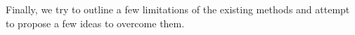 Finally, we try to outline a few limitations of the existing methods and attempt to propose a few ideas to overcome them.


\appendix
